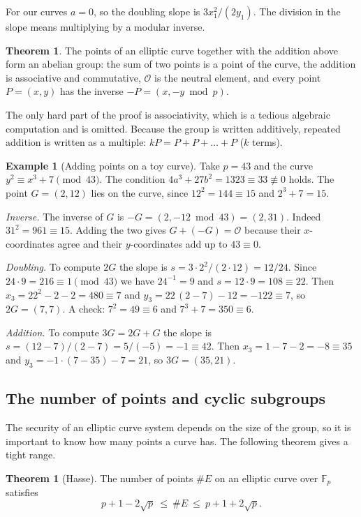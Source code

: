 \documentclass[11pt,a4paper]{article}
\theoremstyle{definition}
\newtheorem{theorem}[definition]{Theorem}
\newtheorem{example}[definition]{Example}
\newcommand{\F}{\mathbb{F}}
\begin{document}
For our curves $a=0$, so the doubling slope is $3x_1^2/(2y_1)$. The division in the slope means multiplying by a modular inverse.

\begin{theorem}
The points of an elliptic curve together with the addition above form an abelian group: the sum of two points is a point of the curve, the addition is associative and commutative, $\mathcal{O}$ is the neutral element, and every point $P=(x,y)$ has the inverse $-P=(x,-y \bmod p)$.
\end{theorem}

The only hard part of the proof is associativity, which is a tedious algebraic computation and is omitted. Because the group is written additively, repeated addition is written as a multiple: $kP=P+P+\dots+P$ ($k$ terms).

\begin{example}[Adding points on a toy curve]\label{ex:ecadd}
Take $p=43$ and the curve $y^2\equiv x^3+7 \pmod{43}$. The condition $4a^3+27b^2=1323\equiv 33\not\equiv 0$ holds. The point $G=(2,12)$ lies on the curve, since $12^2=144\equiv 15$ and $2^3+7=15$.

\emph{Inverse.} The inverse of $G$ is $-G=(2,-12 \bmod 43)=(2,31)$. Indeed $31^2=961\equiv 15$. Adding the two gives $G+(-G)=\mathcal{O}$ because their $x$-coordinates agree and their $y$-coordinates add up to $43\equiv 0$.

\emph{Doubling.} To compute $2G$ the slope is $s=3\cdot 2^2/(2\cdot 12)=12/24$. Since $24\cdot 9=216\equiv 1 \pmod{43}$ we have $24^{-1}=9$ and $s=12\cdot 9=108\equiv 22$. Then $x_3=22^2-2-2=480\equiv 7$ and $y_3=22\,(2-7)-12=-122\equiv 7$, so $2G=(7,7)$. A check: $7^2=49\equiv 6$ and $7^3+7=350\equiv 6$.

\emph{Addition.} To compute $3G=2G+G$ the slope is $s=(12-7)/(2-7)=5/(-5)=-1\equiv 42$. Then $x_3=1-7-2=-8\equiv 35$ and $y_3=-1\cdot(7-35)-7=21$, so $3G=(35,21)$.
\end{example}

\subsection{The number of points and cyclic subgroups}

The security of an elliptic curve system depends on the size of the group, so it is important to know how many points a curve has. The following theorem gives a tight range.

\begin{theorem}[Hasse]
The number of points $\#E$ on an elliptic curve over $\F_p$ satisfies
\[
p+1-2\sqrt p\ \le\ \#E\ \le\ p+1+2\sqrt p .
\]
\end{theorem}
\end{document}
